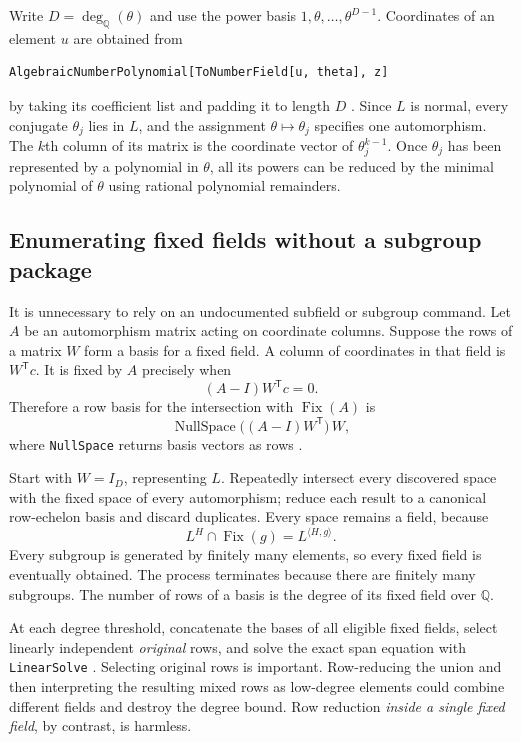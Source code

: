 \documentclass[11pt,letterpaper]{article}
\theoremstyle{definition}
\newcommand{\Q}{\mathbb Q}
\newcommand{\Fix}{\operatorname{Fix}}
\newcommand{\dq}{\deg_{\Q}}
\newcommand{\code}[1]{\texttt{#1}}
\begin{document}
Write $D=\dq(\theta)$ and use the power basis $1,\theta,\ldots,\theta^{D-1}$. Coordinates of an element $u$ are obtained from
\begin{samepage}
\begin{lstlisting}
AlgebraicNumberPolynomial[ToNumberField[u, theta], z]
\end{lstlisting}
\end{samepage}
by taking its coefficient list and padding it to length $D$ \cite{algnumpoly}. Since $L$ is normal, every conjugate $\theta_j$ lies in $L$, and the assignment $\theta\mapsto\theta_j$ specifies one automorphism. The $k$th column of its matrix is the coordinate vector of $\theta_j^{k-1}$. Once $\theta_j$ has been represented by a polynomial in $\theta$, all its powers can be reduced by the minimal polynomial of $\theta$ using rational polynomial remainders.

\subsection{Enumerating fixed fields without a subgroup package}
It is unnecessary to rely on an undocumented subfield or subgroup command. Let $A$ be an automorphism matrix acting on coordinate columns. Suppose the rows of a matrix $W$ form a basis for a fixed field. A column of coordinates in that field is $W^{\mathsf T}c$. It is fixed by $A$ precisely when
\[
 (A-I)W^{\mathsf T}c=0.
\]
Therefore a row basis for the intersection with $\Fix(A)$ is
\begin{equation}\label{eq:intersectionmatrix}
 \operatorname{NullSpace}\bigl((A-I)W^{\mathsf T}\bigr)\,W,
\end{equation}
where \code{NullSpace} returns basis vectors as rows \cite{nullspace}.

Start with $W=I_D$, representing $L$. Repeatedly intersect every discovered space with the fixed space of every automorphism; reduce each result to a canonical row-echelon basis and discard duplicates. Every space remains a field, because
\[
 L^H\cap\Fix(g)=L^{\langle H,g\rangle}.
\]
Every subgroup is generated by finitely many elements, so every fixed field is eventually obtained. The process terminates because there are finitely many subgroups. The number of rows of a basis is the degree of its fixed field over $\Q$.

At each degree threshold, concatenate the bases of all eligible fixed fields, select linearly independent \emph{original} rows, and solve the exact span equation with \code{LinearSolve} \cite{linearsolve}. Selecting original rows is important. Row-reducing the union and then interpreting the resulting mixed rows as low-degree elements could combine different fields and destroy the degree bound. Row reduction \emph{inside a single fixed field}, by contrast, is harmless.
\end{document}
